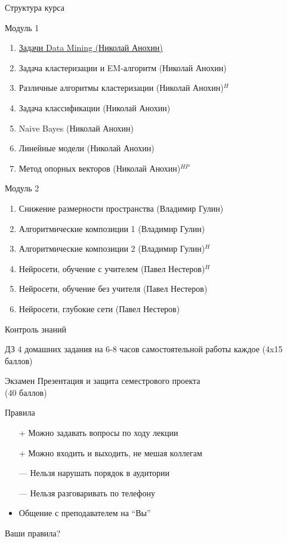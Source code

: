 \documentclass[10pt]{beamer}
\begin{document}
\begin{frame}{Структура курса}

{\small
Модуль 1
\begin{enumerate}
\item \underline{Задачи Data Mining (Николай Анохин)}
\item Задача кластеризации и EM-алгоритм (Николай Анохин)
\item Различные алгоритмы кластеризации (Николай Анохин){\color{red}$^{H}$}
\item Задача классификации (Николай Анохин)
\item Naive Bayes (Николай Анохин)
\item Линейные модели (Николай Анохин)
\item Метод опорных векторов (Николай Анохин){\color{red}$^{HP}$}
\end{enumerate}

Модуль 2
\begin{enumerate}
\item Снижение размерности пространства (Владимир Гулин)
\item Алгоритмические композиции 1 (Владимир Гулин)
\item Алгоритмические композиции 2 (Владимир Гулин){\color{red}$^{H}$}
\item Нейросети, обучение с учителем (Павел Нестеров){\color{red}$^{H}$}
\item Нейросети, обучение без учителя (Павел Нестеров)
\item Нейросети, глубокие сети (Павел Нестеров)
\end{enumerate}
}

\end{frame}

\begin{frame}{Контроль знаний}

\begin{block}{ДЗ}
4 домашних задания на 6-8 часов самостоятельной работы каждое (4x15 баллов)
\end{block}

\begin{alertblock}{Экзамен}
Презентация и защита семестрового проекта \\ (40 баллов)
\end{alertblock}

\end{frame}

\begin{frame}{Правила}

\begin{itemize}
\item[+] Можно задавать вопросы по ходу лекции
\item[+] Можно входить и выходить, не мешая коллегам
\item[---] Нельзя нарушать порядок в аудитории
\item[---] Нельзя разговаривать по телефону
\item Общение с преподавателем на ``Вы''
\end{itemize}

Ваши правила?

\end{frame}
\end{document}
